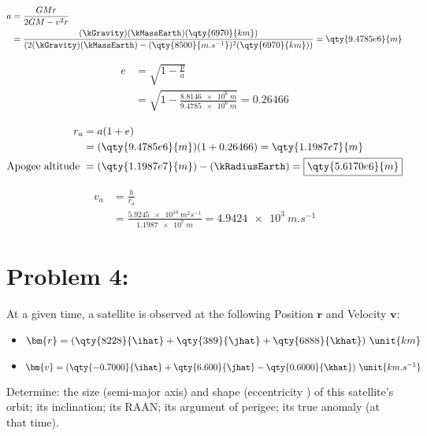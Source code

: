 \documentclass{article}
\begin{document}
{	\begin{equation*}
		\begin{split}
			a &= \frac{GMr}{2GM - v^2 r} \\
			&= \frac{(\kGravity)(\kMassEarth)(\qty{6970}{km})}{(2(\kGravity)(\kMassEarth)-(\qty{8500}{m.s^{-1}})^2(\qty{6970}{km}))} = \qty{9.4785e6}{m} \\
		\end{split}
	\end{equation*}
	
	\begin{equation*}
		\begin{split}
			e &= \sqrt{1 - \frac{p}{a}} \\
			&= \sqrt{1 - \frac{\qty{8.8146e6}{m}}{\qty{9.4785e6}{m}}} = \boxed{0.26466}
		\end{split}
	\end{equation*}
	
	\begin{equation*}
		\begin{split}
			r_a &= a(1+e) \\
			&= (\qty{9.4785e6}{m})(1+0.26466) = \qty{1.1987e7}{m} \\
			\text{Apogee altitude } &= (\qty{1.1987e7}{m}) - (\kRadiusEarth) = \boxed{\qty{5.6170e6}{m}}
		\end{split}
	\end{equation*}
	
	\begin{equation*}
		\begin{split}
			v_a &= \frac{h}{r_a} \\
			&= \frac{\qty{5.9245e10}{m^2 s^{-1}}}{\qty{1.1987e7}{m}} = \boxed{\qty{4.9424e3}{m.s^{-1}}}
		\end{split}
	\end{equation*}
	
	

	\clearpage
	
	\section*{Problem 4: }
	At a given time, a satellite is observed at the following Position $\bm{r}$ and Velocity $\bm{v}$:
	\begin{itemize}
		\item $\bm{r} = (\qty{8228}{\ihat} + \qty{389}{\jhat} + \qty{6888}{\khat} ) \ \unit{km}$
		\item $\bm{v} = (\qty{-0.7000}{\ihat} + \qty{6.600}{\jhat} - \qty{0.6000}{\khat}) \ \unit{km.s^{-1}}$
	\end{itemize}
	Determine: the size (semi-major axis) and shape (eccentricity ) of this satellite's orbit; its inclination; its RAAN; its argument of perigee; its true anomaly (at that time).
	
}
\end{document}
